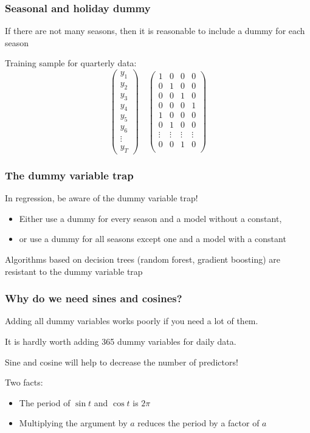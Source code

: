 \begin{frame}
	\frametitle{Seasonal and holiday dummy}
	
	If there are \alert{not many} seasons, then it is reasonable to include a dummy for each season
	
	\pause
	\alert{Training} sample for quarterly data:
	\[
	\begin{pmatrix}
		y_1 \\
		y_2 \\
		y_3 \\
		y_4 \\
		y_5 \\
		y_6 \\
		\vdots \\
		y_T
	\end{pmatrix} \quad
	\begin{pmatrix}
		1 & 0 & 0 & 0 \\
		0 & 1 & 0 & 0 \\
		0 & 0 & 1 & 0 \\
		0 & 0 & 0 & 1 \\
		1 & 0 & 0 & 0 \\
		0 & 1 & 0 & 0 \\
		\vdots & \vdots & \vdots & \vdots \\
		0 & 0 & 1 & 0 \\
	\end{pmatrix}
	\]
\end{frame}


\begin{frame}
	\frametitle{The dummy variable trap}
	
	
	In \alert{regression}, be aware of the dummy variable \alert{trap}! \pause
	
	\begin{itemize}[<+->]
		\item Either use a dummy for every season and a model without a constant,
		\item or use a dummy for all seasons except one and a model with a constant
	\end{itemize}
	
	\pause
	Algorithms based on  \alert{decision trees} (random forest, gradient boosting) are
	\alert{resistant} to the dummy variable trap
\end{frame}


\begin{frame}
	\frametitle{Why do we need sines and cosines?}
	
	Adding all dummy variables works \alert{poorly}  if you need \alert{a lot} of them. \pause
	
	It is hardly worth adding 365 dummy variables for \alert{daily} data. \pause
	
	Sine and cosine will help to decrease the  \alert{number} of predictors!
	
	\pause
	Two facts:
	\begin{itemize}[<+->]
		\item The period of $\sin t$ and $\cos t$ is $2\pi$
		\item Multiplying the argument by $a$ reduces the \alert{period} by a factor of $a$
	\end{itemize}
	
\end{frame}


